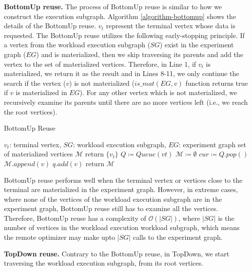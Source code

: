 {\textbf{BottomUp reuse.}
The process of BottomUp reuse is similar to how we construct the execution subgraph.
Algorithm \ref{algorithm-bottomup} shows the details of the BottomUp reuse.
$v_t$ represent the terminal vertex whose data is requested.
The BottomUp reuse utilizes the following early-stopping principle. 
If a vertex from the workload execution subgraph ($SG$) exist in the experiment graph ($EG$) and is materialized, then we skip traversing its parents and add the vertex to the set of materialized vertices.
Therefore, in Line 1, if $v_t$ is materialized, we return it as the result and in Lines 8-11, we only continue the search if the vertex ($v$) is not materialized ($is\_mat(EG, v)$ function returns true if $v$ is materialized in $EG$).
For any other vertex which is not materialized, we recursively examine its parents until there are no more vertices left (i.e., we reach the root vertices).
\begin{algorithm}[h]
\caption{BottomUp Reuse}\label{algorithm-bottomup}
\begin{algorithmic}[1]
\Require $v_t$: terminal vertex, $SG$: workload execution subgraph, $EG$: experiment graph 
\Ensure set of materialized vertices $\mathcal{M}$ 
	\State return $\{v_t\}$
\EndIf
\State $Q \coloneqq  Queue(vt)$  
\State $\mathcal{M} \coloneqq \emptyset$
	\State $cur  \coloneqq  Q.pop()$
			\State	$\mathcal{M}.append(v)$
		\Else
			\State $q.add(v)$
		\EndIf
	\EndFor
\EndWhile
\State return $\mathcal{M}$
\end{algorithmic}
\end{algorithm}
BottomUp reuse performs well when the terminal vertex or vertices close to the terminal are materialized in the experiment graph.
However, in extreme cases, where none of the vertices of the workload execution subgraph are in the experiment graph, BottomUp reuse still has to examine all the vertices.
Therefore, BottomUp reuse has a complexity of $\mathcal{O}(|SG|)$, where $|SG|$ is the number of vertices in the workload execution workload subgraph, which means the remote optimizer may make upto $|SG|$ calls to the experiment graph.

\textbf{TopDown reuse.}
Contrary to the BottomUp reuse, in TopDown, we start traversing the workload execution subgraph, from its root vertices.

}
